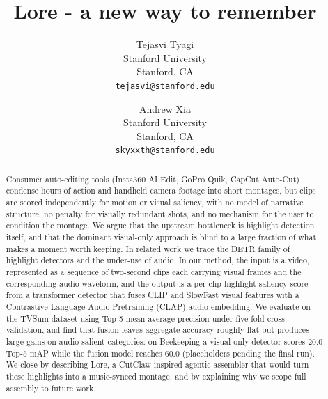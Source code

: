 \documentclass[10pt,twocolumn,letterpaper]{article}
\begin{document}
\title{Lore - a new way to remember}

\author{Tejasvi Tyagi\\
Stanford University\\
Stanford, CA\\
{\tt\small tejasvi@stanford.edu}
\and
Andrew Xia\\
Stanford University\\
Stanford, CA\\
{\tt\small skyxxth@stanford.edu}
}

\maketitle

\begin{abstract}
   Consumer auto-editing tools (Insta360 AI Edit, GoPro Quik, CapCut Auto-Cut) condense hours of action and handheld camera footage into short montages, but clips are scored independently for motion or visual saliency, with no model of narrative structure, no penalty for visually redundant shots, and no mechanism for the user to condition the montage. We argue that the upstream bottleneck is highlight detection itself, and that the dominant visual-only approach is blind to a large fraction of what makes a moment worth keeping. In related work we trace the DETR family of highlight detectors and the under-use of audio. In our method, the input is a video, represented as a sequence of two-second clips each carrying visual frames and the corresponding audio waveform, and the output is a per-clip highlight saliency score from a transformer detector that fuses CLIP and SlowFast visual features with a Contrastive Language-Audio Pretraining (CLAP) audio embedding. We evaluate on the TVSum dataset using Top-5 mean average precision under five-fold cross-validation, and find that fusion leaves aggregate accuracy roughly flat but produces large gains on audio-salient categories: on Beekeeping a visual-only detector scores 20.0 Top-5 mAP while the fusion model reaches 60.0 (placeholders pending the final run). We close by describing Lore, a CutClaw-inspired agentic assembler that would turn these highlights into a music-synced montage, and by explaining why we scope full assembly to future work.
\end{abstract}
\end{document}
